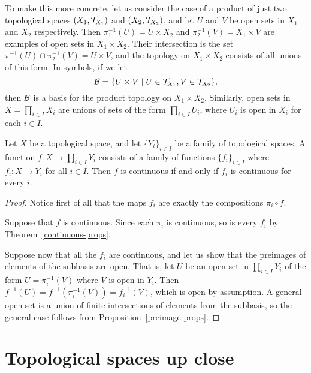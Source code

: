 To make this more concrete, let us consider the case of a product of just two topological spaces $(X_1,\mathcal{T}_{X_1})$ and $(X_2,\mathcal{T}_{X_2})$, and let $U$ and $V$ be open sets in $X_1$ and $X_2$ respectively. Then $\pi_1^{-1}(U) = U \times X_2$ and $\pi_2^{-1}(V) = X_1 \times V$ are examples of open sets in $X_1 \times X_2$. Their intersection is the set $\pi_1^{-1}(U) \cap \pi_2^{-1}(V) = U \times V$, and the topology on $X_1 \times X_2$ consists of all unions of this form. In symbols, if we let
\[
  \mathcal{B} = \{ U \times V \mid U \in \mathcal{T}_{X_1}, V \in \mathcal{T}_{X_2} \},
\]
then $\mathcal{B}$ is a basis for the product topology on $X_1 \times X_2$. Similarly, open sets in $X = \prod_{i \in I} X_i$ are unions of sets of the form $\prod_{i \in I} U_i$, where $U_i$ is open in $X_i$ for each $i \in I$.

\begin{thm}
  Let $X$ be a topological space, and let $\{Y_i\}_{i \in I}$ be a family of topological spaces. A function $f : X \to \prod_{i \in I} Y_i$ consists of a family of functions $\{f_i\}_{i \in I}$ where $f_i : X \to Y_i$ for all $i \in I$. Then $f$ is continuous if and only if $f_i$ is continuous for every $i$.
\end{thm}
\begin{proof}
  Notice first of all that the maps $f_i$ are exactly the compositions $\pi_i \circ f$.
  
  Suppose that $f$ is continuous. Since each $\pi_i$ is continuous, so is every $f_i$ by Theorem~\ref{continuous-props}.
  
  Suppose now that all the $f_i$ are continuous, and let us show that the preimages of elements of the subbasis are open. That is, let $U$ be an open set in $\prod_{i \in I} Y_i$ of the form $U = \pi_i^{-1}(V)$ where $V$ is open in $Y_i$. Then $f^{-1}(U) = f^{-1}(\pi_i^{-1}(V)) = f_i^{-1}(V)$, which is open by assumption. A general open set is a union of finite intersections of elements from the subbasis, so the general case follows from Proposition~\ref{preimage-props}.
\end{proof}


\section{Topological spaces up close}

